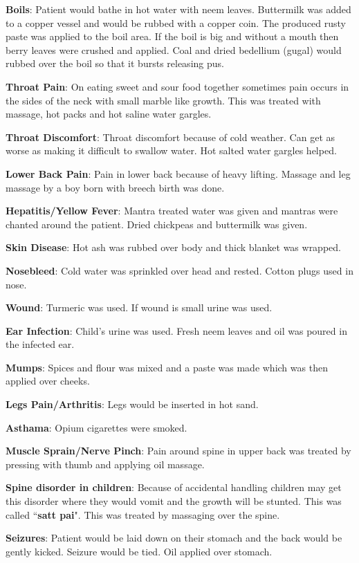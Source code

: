 \textbf{Boils}: Patient would bathe in hot water with neem leaves. Buttermilk
was added to a copper vessel and would be rubbed with a copper coin. The
produced rusty paste was applied to the boil area. If the boil is big and
without a mouth then berry leaves were crushed and applied. Coal and dried
bedellium (gugal) would rubbed over the boil so that it bursts releasing pus.

\textbf{Throat Pain}: On eating sweet and sour food together sometimes pain
occurs in the sides of the neck with small marble like growth. This was treated
with massage, hot packs and hot saline water gargles.

\textbf{Throat Discomfort}: Throat discomfort because of cold weather. Can get
as worse as making it difficult to swallow water. Hot salted water gargles
helped.

\textbf{Lower Back Pain}: Pain in lower back because of heavy lifting. Massage
and leg massage by a boy born with breech birth was done.

\textbf{Hepatitis/Yellow Fever}: Mantra treated water was given and mantras
were chanted around the patient. Dried chickpeas and buttermilk was given.

\textbf{Skin Disease}: Hot ash was rubbed over body and thick blanket was
wrapped.

\textbf{Nosebleed}: Cold water was sprinkled over head and rested. Cotton plugs
used in nose.

\textbf{Wound}: Turmeric was used. If wound is small urine was used.

\textbf{Ear Infection}: Child's urine was used. Fresh neem leaves and oil was
poured in the infected ear.

\textbf{Mumps}: Spices and flour was mixed and a paste was made which was then
applied over cheeks.

\textbf{Legs Pain/Arthritis}: Legs would be inserted in hot sand.

\textbf{Asthama}: Opium cigarettes were smoked.

\textbf{Muscle Sprain/Nerve Pinch}: Pain around spine in upper back was treated
by pressing with thumb and applying oil massage. 

\textbf{Spine disorder in children}: Because of accidental handling children
may get this disorder where they would vomit and the growth will be stunted.
This was called ``\textbf{satt pai}". This was treated by massaging over the
spine.

\textbf{Seizures}: Patient would be laid down on their stomach and the back
would be gently kicked. Seizure would be tied. Oil applied over stomach. 

